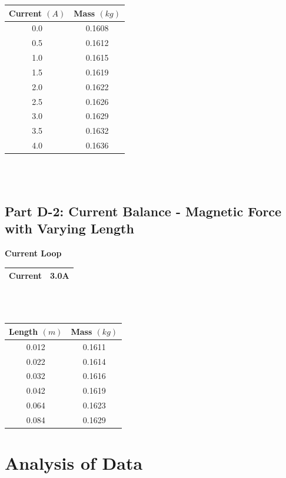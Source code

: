 \documentclass[titlepage]{article}
\begin{document}
\begin{center}\label{tbl6}
	\begin{tabular}{cc}
	\hline
	Current $(A)$ & Mass $(kg)$\\
	\hline
	0.0 & 0.1608\\
	\hline
	0.5 & 0.1612\\
	\hline
	1.0 & 0.1615\\
	\hline
	1.5 & 0.1619\\
	\hline
	2.0 & 0.1622\\
	\hline
	2.5 & 0.1626\\
	\hline
	3.0 & 0.1629\\
	\hline
	3.5 & 0.1632\\
	\hline
	4.0 & 0.1636\\
	\hline
	\end{tabular}
\end{center}\\
\\

\subsection{Part D-2: Current Balance - Magnetic Force with Varying Length}\label{sub:part_d_2_current_balance_magnetic_force_with_varying_length-data}

\begin{center}\label{tbl7}
	\textbf{Current Loop}\\
	\begin{tabular}{cc}
	\hline
	Current & 3.0A\\
	\hline
	\end{tabular}
\end{center}\\
\\
\begin{center}\label{tbl8}
	\begin{tabular}{cc}
	\hline
	Length $(m)$ & Mass $(kg)$\\
	\hline
	0.012 & 0.1611\\
	\hline
	0.022 & 0.1614\\
	\hline
	0.032 & 0.1616\\
	\hline
	0.042 & 0.1619\\
	\hline
	0.064 & 0.1623\\
	\hline
	0.084 & 0.1629\\
	\hline
	\end{tabular}
\end{center}

\section{Analysis of Data}\label{sec:analysis_of_data}
\end{document}

